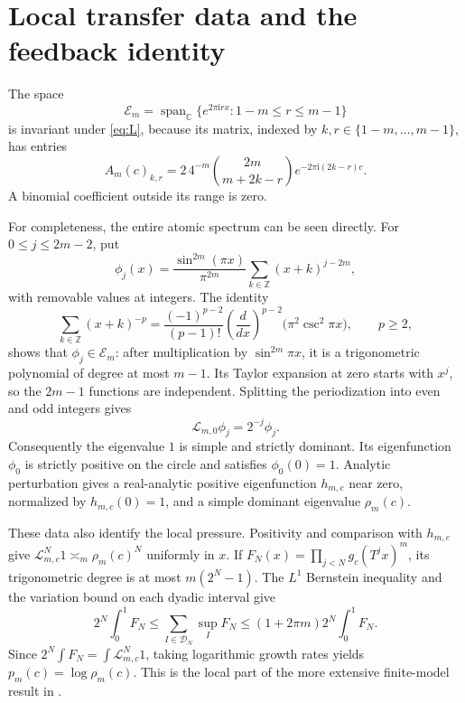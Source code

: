 \documentclass[11pt,a4paper]{article}
\theoremstyle{remark}\newtheorem*{ednote}{Editorial note (ProveIt, 2026-10-01)}
\newcommand{\Z}{\mathbb Z}\newcommand{\T}{\mathbb T}\newcommand{\E}{\mathcal E}
\newcommand{\Lop}{\mathcal L}\newcommand{\ii}{\mathrm i}
\begin{document}
\section{Local transfer data and the feedback identity}\label{sec:local}
The space
\[
 \E_m=\operatorname{span}_{\mathbb C}\{e^{2\pi\ii r x}:1-m\le r\le m-1\}
\]
is invariant under \eqref{eq:L}, because its matrix, indexed by $k,r\in\{1-m,\ldots,m-1\}$, has entries
\begin{equation}\label{eq:matrix}
 A_m(c)_{k,r}=2\,4^{-m}\binom{2m}{m+2k-r}
                   e^{-2\pi\ii(2k-r)c}.
\end{equation}
A binomial coefficient outside its range is zero.

For completeness, the entire atomic spectrum can be seen directly. For $0\le j\le2m-2$, put
\[
 \phi_j(x)=\frac{\sin^{2m}(\pi x)}{\pi^{2m}}
       \sum_{k\in\Z}(x+k)^{j-2m},
\]
with removable values at integers. The identity
\[
 \sum_{k\in\Z}(x+k)^{-p}
 =\frac{(-1)^{p-2}}{(p-1)!}
   \left(\frac{d}{dx}\right)^{p-2}\!\bigl(\pi^2\csc^2\pi x\bigr),
 \qquad p\ge2,
\]
shows that $\phi_j\in\E_m$: after multiplication by $\sin^{2m}\pi x$, it is a trigonometric polynomial of degree at most $m-1$. Its Taylor expansion at zero starts with $x^j$, so the $2m-1$ functions are independent. Splitting the periodization into even and odd integers gives
\[
 \Lop_{m,0}\phi_j=2^{-j}\phi_j.
\]
Consequently the eigenvalue $1$ is simple and strictly dominant. Its eigenfunction $\phi_0$ is strictly positive on the circle and satisfies $\phi_0(0)=1$. Analytic perturbation gives a real-analytic positive eigenfunction $h_{m,c}$ near zero, normalized by $h_{m,c}(0)=1$, and a simple dominant eigenvalue $\rho_m(c)$.

These data also identify the local pressure. Positivity and comparison with $h_{m,c}$ give $\Lop_{m,c}^N1\asymp_m\rho_m(c)^N$ uniformly in $x$. If $F_N(x)=\prod_{j<N}g_c(T^jx)^m$, its trigonometric degree is at most $m(2^N-1)$. The $L^1$ Bernstein inequality and the variation bound on each dyadic interval give
\[
 2^N\!\int_0^1 F_N\le\sum_{I\in\mathcal D_N}\sup_I F_N
 \le(1+2\pi m)2^N\!\int_0^1 F_N.
\]
Since $2^N\int F_N=\int\Lop_{m,c}^N1$, taking logarithmic growth rates yields $p_m(c)=\log\rho_m(c)$. This is the local part of the more extensive finite-model result in \cite{integer}.
\end{document}
